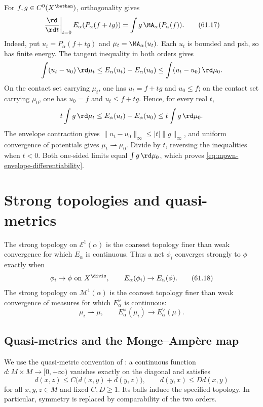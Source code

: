 \begin{remark}\label{rem:mpwn-envelope-first-variation}
For $f,g\in C^0(X^{\bethan})$, orthogonality gives
\[
 \left.\frac{\rd}{\rd t}\right|_{t=0}
 E_\alpha(P_\alpha(f+tg))
                  =\int g\,\MA_\alpha(P_\alpha(f)).
\tag{61.17}\label{eq:mpwn-envelope-differentiability}
\]
Indeed, put $u_t=P_\alpha(f+tg)$ and
$\mu_t=\MA_\alpha(u_t)$.  Each $u_t$ is bounded and psh,
so has finite energy.  The tangent inequality in both orders
gives
\[
 \int(u_t-u_0)\,\rd\mu_t
       \leq E_\alpha(u_t)-E_\alpha(u_0)
       \leq\int(u_t-u_0)\,\rd\mu_0.
\]
On the contact set carrying $\mu_t$, one has
$u_t=f+tg$ and $u_0\leq f$; on the contact set carrying
$\mu_0$, one has $u_0=f$ and $u_t\leq f+tg$.
Hence, for every real $t$,
\[
 t\int g\,\rd\mu_t
       \leq E_\alpha(u_t)-E_\alpha(u_0)
       \leq t\int g\,\rd\mu_0.
\]
The envelope contraction gives
$\|u_t-u_0\|_\infty\leq |t|\|g\|_\infty$, and uniform
convergence of potentials gives $\mu_t\rightharpoonup\mu_0$.
Divide by $t$, reversing the inequalities when $t<0$.
Both one-sided limits equal $\int g\,\rd\mu_0$, which proves
\eqref{eq:mpwn-envelope-differentiability}.
\end{remark}


\section{Strong topologies and quasi-metrics}
\label{sec:mpwn-strong-topologies}

The strong topology on $\mathcal E^1(\alpha)$ is the coarsest topology
finer than weak convergence for which $E_\alpha$ is continuous.  Thus a
net $\phi_i$ converges strongly to $\phi$ exactly when
\[
 \phi_i\to\phi\text{ on }X^{\divis},
 \qquad E_\alpha(\phi_i)\to E_\alpha(\phi).
\tag{61.18}\label{eq:mpwn-potential-strong}
\]
The strong topology on $\mathcal M^1(\alpha)$ is the coarsest topology
finer than weak convergence of measures for which $E_\alpha^\vee$ is
continuous:
\[
 \mu_i\rightharpoonup\mu,
 \qquad E_\alpha^\vee(\mu_i)\to E_\alpha^\vee(\mu).
\tag{61.19}\label{eq:mpwn-measure-strong}
\]

\subsection{Quasi-metrics and the Monge--Amp\`ere map}
\label{subsec:mpwn-quasi-metrics}

We use the quasi-metric convention of \cite[Definition~5.1.1, p.~20]{MPWN25}: a continuous function $d:M\times M\to[0,+\infty)$ vanishes exactly on the diagonal and satisfies
\[
 d(x,z)\leq C\bigl(d(x,y)+d(y,z)\bigr),
 \qquad d(y,x)\leq Dd(x,y)
\]
for all $x,y,z\in M$ and fixed $C,D\geq1$. Its balls induce the specified topology. In particular, symmetry is replaced by comparability of the two orders.

